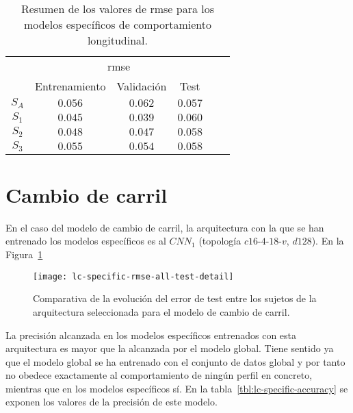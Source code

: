\begin{table}
	\centering
	\caption[Resumen de los valores de \gls{rmse} para los modelos específicos de comportamiento longitudinal]{Resumen de los valores de \gls{rmse} para los modelos específicos de comportamiento longitudinal.}
	\label{tbl:lm-specific-rmse}
	\begin{tabular}{cccccc}
		\toprule
		\multirow{2}{*}{} & \multicolumn{3}{c}{\ac{rmse}}      \\ 
		& Entrenamiento & Validación & Test \\
		\midrule
		\rowcolor{black!20} $S_A$ & $0.056$ & $0.062$ & $0.057$  \\
		$S_1$ & $0.045$ & $0.039$ & $0.060$  \\
		\rowcolor{black!20} $S_2$ & $0.048$ & $0.047$ & $0.058$  \\
		$S_3$ & $0.055$ & $0.054$ & $0.058$  \\
		\bottomrule
	\end{tabular}
\end{table}

\section{Cambio de carril}

En el caso del modelo de cambio de carril, la arquitectura con la que se han entrenado los modelos específicos es al $CNN_1$ (topología $c16$-$4$-$18$-$v$, $d128$). En la Figura~\ref{fig:lc-specific-rmse-all-test-detail} 

\begin{figure}
	\centering
	\texttt{[image: lc-specific-rmse-all-test-detail]}
	\caption[Comparativa de la evolución del \gls{rmse} en test entre los sujetos de la arquitectura seleccionada para el modelo de cambio de carril]{Comparativa de la evolución del error de test entre los sujetos de la arquitectura seleccionada para el modelo de cambio de carril.}
	\label{fig:lc-specific-rmse-all-test-detail}
\end{figure}

La precisión alcanzada en los modelos específicos entrenados con esta arquitectura es mayor que la alcanzada por el modelo global. Tiene sentido ya que el modelo global se ha entrenado con el conjunto de datos global y por tanto no obedece exactamente al comportamiento de ningún perfil en concreto, mientras que en los modelos específicos sí. En la tabla~\ref{tbl:lc-specific-accuracy} se exponen los valores de la precisión de este modelo.

